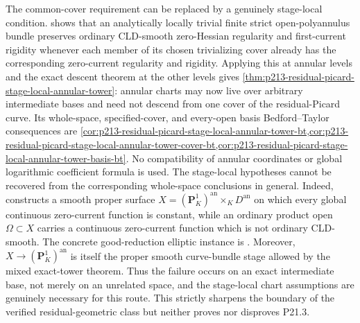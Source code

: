 The common-cover requirement can be replaced by a genuinely stage-local
condition.  
shows that
an analytically locally trivial finite strict open-polyannulus bundle
preserves ordinary CLD-smooth zero-Hessian regularity and first-current
rigidity whenever each member of its chosen trivializing cover already has
the corresponding zero-current regularity and rigidity.  Applying this at
annular levels and the exact descent theorem at the other levels gives
\cref{thm:p213-residual-picard-stage-local-annular-tower}: annular charts may
now live over arbitrary intermediate bases and need not descend from one
cover of the residual-Picard curve.  Its whole-space, specified-cover, and
every-open basis Bedford--Taylor consequences are
\cref{cor:p213-residual-picard-stage-local-annular-tower-bt,cor:p213-residual-picard-stage-local-annular-tower-cover-bt,cor:p213-residual-picard-stage-local-annular-tower-basis-bt}.
No compatibility of annular coordinates or global logarithmic coefficient
formula is used.  The stage-local hypotheses cannot be recovered from the
corresponding whole-space conclusions in general.  Indeed,
 constructs a
smooth proper surface \(X=(\mathbf P^1_K)^{\mathrm{an}}\times_KD^{\mathrm{an}}\)
on which every global continuous zero-current function is constant, while
an ordinary product open \(\Omega\subset X\) carries a continuous
zero-current function which is not ordinary CLD-smooth.  The concrete
good-reduction elliptic instance is
.  Moreover,
\(X\to(\mathbf P^1_K)^{\mathrm{an}}\) is itself the proper smooth curve-bundle
stage allowed by the mixed exact-tower theorem.  Thus the failure occurs on
an exact intermediate base, not merely on an unrelated space, and the
stage-local chart assumptions are genuinely necessary for this route.
This strictly sharpens the boundary of the verified residual-geometric
class but neither proves nor disproves P21.3.

